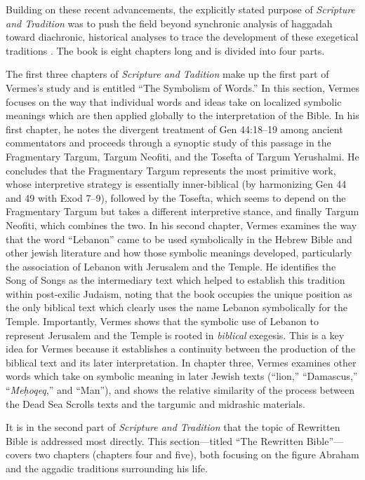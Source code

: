 Building on these recent advancements, the explicitly stated purpose of
\emph{Scripture and Tradition} was to push the field beyond synchronic
analysis of haggadah toward diachronic, historical analyses to trace the
development of these exegetical traditions \autocites[1]{vermes1961}[See
also][]{bloch1955_repr}. The book is eight chapters long and is divided
into four parts.

The first three chapters of \emph{Scripture and Tadition} make up the
first part of Vermes's study and is entitled ``The Symbolism of Words.''
In this section, Vermes focuses on the way that individual words and
ideas take on localized symbolic meanings which are then applied
globally to the interpretation of the Bible. In his first chapter, he
notes the divergent treatment of Gen 44:18--19 among ancient
commentators and proceeds through a synoptic study of this passage in
the Fragmentary Targum, Targum Neofiti, and the Tosefta of Targum
Yerushalmi. He concludes that the Fragmentary Targum represents the most
primitive work, whose interpretive strategy is essentially
inner-biblical (by harmonizing Gen 44 and 49 with Exod 7--9), followed
by the Tosefta, which seems to depend on the Fragmentary Targum but
takes a different interpretive stance, and finally Targum Neofiti, which
combines the two. In his second chapter, Vermes examines the way that
the word ``Lebanon'' came to be used symbolically in the Hebrew Bible
and other jewish literature and how those symbolic meanings developed,
particularly the association of Lebanon with Jerusalem and the Temple.
He identifies the Song of Songs as the intermediary text which helped to
establish this tradition within post-exilic Judaism, noting that the
book occupies the unique position as the only biblical text which
clearly uses the name Lebanon symbolically for the Temple. Importantly,
Vermes shows that the symbolic use of Lebanon to represent Jerusalem and
the Temple is rooted in \emph{biblical} exegesis. This is a key idea for
Vermes because it establishes a continuity between the production of the
biblical text and its later interpretation. In chapter three, Vermes
examines other words which take on symbolic meaning in later Jewish
texts (``lion,'' ``Damascus,'' ``\emph{Meḥoqeq},'' and ``Man''), and
shows the relative similarity of the process between the
Dead Sea Scrolls texts and the targumic and midrashic materials.

It is in the second part of \emph{Scripture and Tradition} that the
topic of Rewritten Bible is addressed most directly. This
section---titled ``The Rewritten Bible''---covers two chapters (chapters
four and five), both focusing on the figure Abraham and the aggadic
traditions surrounding his life.

